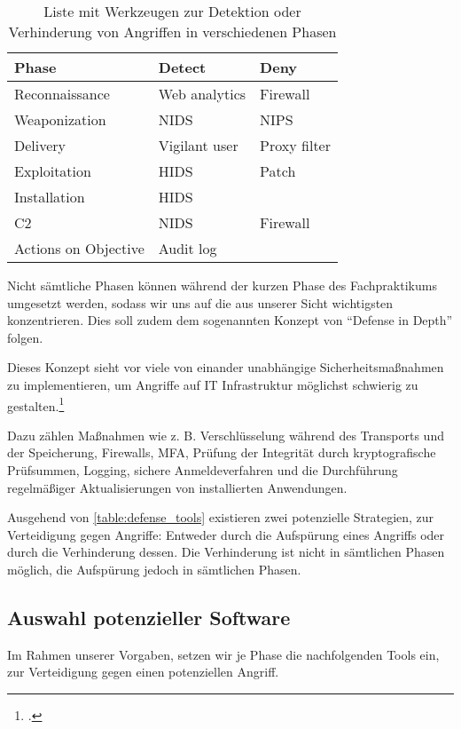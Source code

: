 \begin{table}[]
    \begin{center}
        \begin{tabular}{|l|l|l|}
            \hline
            Phase                & Detect        & Deny         \\ \hline
            Reconnaissance       & Web analytics & Firewall     \\ \hline
            Weaponization        & NIDS          & NIPS         \\ \hline
            Delivery             & Vigilant user & Proxy filter \\ \hline
            Exploitation         & HIDS          & Patch        \\ \hline
            Installation         & HIDS          &              \\ \hline
            C2                   & NIDS          & Firewall     \\ \hline
    Actions on Objective & Audit log     &              \\ \hline
        \end{tabular}
    \caption{Liste mit Werkzeugen zur Detektion oder Verhinderung von Angriffen in verschiedenen Phasen}
    \label{table:defense_tools}
    \end{center}
\end{table}


Nicht sämtliche Phasen können während der kurzen Phase des Fachpraktikums umgesetzt werden, sodass wir uns auf die aus unserer Sicht wichtigsten konzentrieren. Dies soll zudem dem sogenannten Konzept von \enquote{Defense in Depth} folgen.

Dieses Konzept sieht vor viele von einander unabhängige Sicherheitsmaßnahmen zu implementieren, um Angriffe auf IT Infrastruktur möglichst schwierig zu gestalten.\footcite[Vgl.][]{barbu2015defense}

Dazu zählen Maßnahmen wie z. B. Verschlüsselung während des Transports und der Speicherung, Firewalls, \ac{MFA}, Prüfung der Integrität durch kryptografische Prüfsummen, Logging, sichere Anmeldeverfahren und die Durchführung regelmäßiger Aktualisierungen von installierten Anwendungen.

Ausgehend von \autoref{table:defense_tools} existieren zwei potenzielle Strategien, zur Verteidigung gegen Angriffe: Entweder durch die Aufspürung eines Angriffs oder durch die Verhinderung dessen. Die Verhinderung ist nicht in sämtlichen Phasen möglich, die Aufspürung jedoch in sämtlichen Phasen.

\subsection{Auswahl potenzieller Software}
Im Rahmen unserer Vorgaben, setzen wir je Phase die nachfolgenden Tools ein, zur Verteidigung gegen einen potenziellen Angriff.

